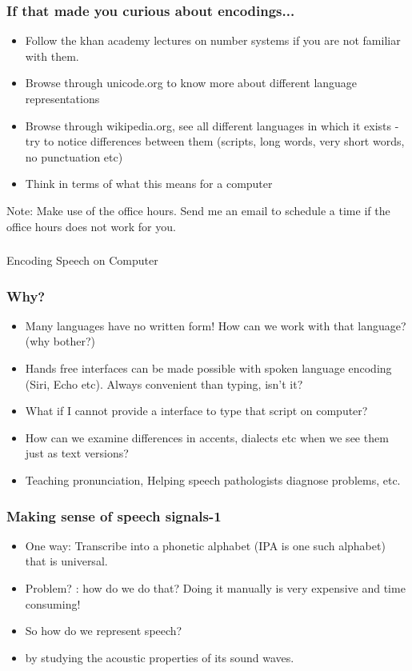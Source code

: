 \documentclass{beamer}
\begin{document}
\begin{frame}
\frametitle{If that made you curious about encodings...}
\begin{itemize}
\item Follow the khan academy lectures on number systems if you are not familiar with them.
\item Browse through unicode.org to know more about different language representations
\item Browse through wikipedia.org, see all different languages in which it exists - try to notice differences between them (scripts, long words, very short words, no punctuation etc)
\item Think in terms of what this means for a computer
\end{itemize}
Note: Make use of the office hours. Send me an email to schedule a time if the office hours does not work for you. 
\end{frame}

\begin{frame}
\frametitle{}
Encoding Speech on Computer
\end{frame}

\begin{frame}
\frametitle{Why?}
\begin{itemize}
\item Many languages have no written form! How can we work with that language? (why bother?) \pause
\item Hands free interfaces can be made possible with spoken language encoding (Siri, Echo etc).  Always convenient than typing, isn't it? \pause
\item What if I cannot provide a interface to type that script on computer? \pause
\item How can we examine differences in accents, dialects etc when we see them just as text versions? \pause
\item Teaching pronunciation, Helping speech pathologists diagnose problems, etc. 
\end{itemize}
\end{frame}

\begin{frame}
\frametitle{Making sense of speech signals-1}
\begin{itemize}
\item One way: Transcribe into a phonetic alphabet (IPA is one such alphabet) that is universal.
\item Problem? \pause : how do we do that? Doing it manually is very expensive and time consuming!
\item So how do we represent speech? \pause
\item by studying the acoustic properties of its sound waves.
\end{itemize}
\end{frame}
\end{document}
